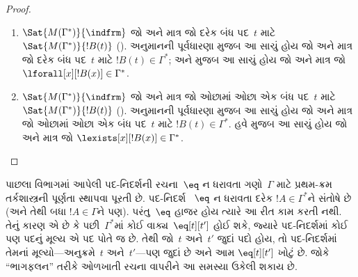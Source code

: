 \begin{proof}
\begin{enumerate}
%
\item %
      {$\Sat{M(\Gamma^*)}{\indfrm}$ જો અને માત્ર જો દરેક બંધ પદ~$t$
      માટે $\Sat{M(\Gamma^*)}{!B(t)}$
      (). અનુમાનની પૂર્વધારણા મુજબ આ સાચું
      હોય જો અને માત્ર જો દરેક બંધ પદ~$t$ માટે $!B(t)\in\Gamma^*$;
      અને  મુજબ આ સાચું હોય જો અને
      માત્ર જો $\lforall[x][!B(x)]\in\Gamma^*$.}

\item %
      {$\Sat{M(\Gamma^*)}{\indfrm}$ જો અને માત્ર જો ઓછામાં ઓછા એક બંધ
      પદ~$t$ માટે $\Sat{M(\Gamma^*)}{!B(t)}$
      (). અનુમાનની પૂર્વધારણા મુજબ આ સાચું
      હોય જો અને માત્ર જો ઓછામાં ઓછા એક બંધ પદ~$t$ માટે
      $!B(t)\in\Gamma^*$. હવે 
      મુજબ આ સાચું હોય જો અને માત્ર જો
      $\lexists[x][!B(x)]\in\Gamma^*$.}
\end{enumerate}
\end{proof}






\endgroup


%
  \begingroup
\makeatletter{}\makeatother

\label{guunit:OLP-0133}


\begin{explain}
પાછલા વિભાગમાં આપેલી પદ-નિદર્શની રચના~$\eq$ ન ધરાવતા ગણો~$\Gamma$
માટે પ્રથમ-ક્રમ તર્કશાસ્ત્રની પૂર્ણતા સ્થાપવા પૂરતી છે. પદ-નિદર્શ
~$\eq$ ન ધરાવતા દરેક $!A \in \Gamma^*$ને સંતોષે છે (અને તેથી બધા
$!A \in \Gamma$ને પણ). પરંતુ~$\eq$ હાજર હોય ત્યારે આ રીત કામ
કરતી નથી. તેનું કારણ એ છે કે પછી~$\Gamma^*$માં કોઈ
વાક્ય~$\eq[t][t']$ હોઈ શકે, જ્યારે પદ-નિદર્શમાં કોઈ પણ પદનું
મૂલ્ય એ પદ પોતે જ છે. તેથી જો~$t$ અને~$t'$ જુદાં પદો હોય, તો
પદ-નિદર્શમાં તેમનાં મૂલ્યો—અનુક્રમે~$t$ અને~$t'$—પણ જુદાં છે અને આમ
$\eq[t][t']$ ખોટું છે. જોકે ``ભાગફલન'' તરીકે ઓળખાતી રચના વાપરીને આ
સમસ્યા ઉકેલી શકાય છે.
\end{explain}


